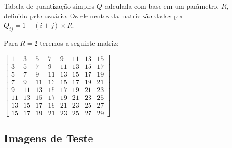 \begin{frame}[allowframebreaks]
  \framebreak

  Tabela de quantização simples $Q$ calculada com base em um parâmetro, $R$, definido pelo usuário.
  Os elementos da matriz são dados por $Q_{ij} = 1 + (i + j) \times R$.

  \vspace{3ex}
  Para $R=2$ teremos a seguinte matriz:

  $  
 \begin{bmatrix}
  1 & 3 & 5 & 7 & 9 & 11 & 13 & 15 \\
  3 & 5 & 7 & 9 & 11 & 13 & 15 & 17 \\
  5 & 7 & 9 & 11 & 13 & 15 & 17 & 19 \\
  7 & 9 & 11 & 13 & 15 & 17 & 19 & 21 \\
  9 & 11 & 13 & 15 & 17 & 19 & 21 & 23 \\
  11 & 13 & 15 & 17 & 19 & 21 & 23 & 25 \\
  13 & 15 & 17 & 19 & 21 & 23 & 25 & 27 \\
  15 & 17 & 19 & 21 & 23 & 25 & 27 & 29 
  \end{bmatrix}
  $
  
\end{frame}




\subsection{Imagens de Teste}

